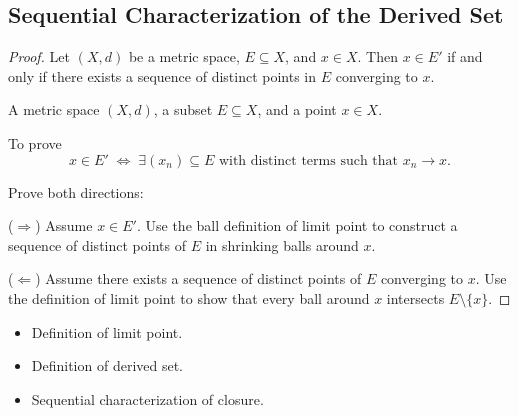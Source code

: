 
\subsection*{Sequential Characterization of the Derived Set}
\label{prf:derived-set-sequential}

\begin{proof}
\Claim Let $(X,d)$ be a metric space, $E \subseteq X$, and $x \in X$.
Then $x \in E'$ if and only if there exists a sequence of distinct
points in $E$ converging to $x$.

\Given A metric space $(X,d)$, a subset $E \subseteq X$, and a point $x \in X$.

\Goal To prove
\[
x \in E'
\;\Longleftrightarrow\;
\exists (x_n) \subseteq E
\text{ with distinct terms such that }
x_n \to x.
\]

\Strategy Prove both directions:

\medskip

\noindent
($\Rightarrow$) Assume $x \in E'$.
Use the ball definition of limit point to construct a sequence
of distinct points of $E$ in shrinking balls around $x$.

\medskip

\noindent
($\Leftarrow$) Assume there exists a sequence of distinct points
of $E$ converging to $x$.
Use the definition of limit point to show that every ball
around $x$ intersects $E \setminus \{x\}$.

\end{proof}

\begin{remark*}[Dependencies]
\begin{itemize}
  \item Definition of limit point.
  \item Definition of derived set.
  \item Sequential characterization of closure.
\end{itemize}
\end{remark*}








